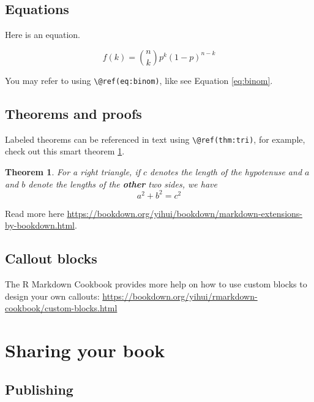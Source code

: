 \documentclass[
]{book}
\newtheorem{theorem}{Theorem}[chapter]
\theoremstyle{definition}
\theoremstyle{definition}
\theoremstyle{definition}
\theoremstyle{definition}
\theoremstyle{remark}
\begin{document}
\hypertarget{equations}{%
\section{Equations}\label{equations}}

Here is an equation.

\begin{equation} 
  f\left(k\right) = \binom{n}{k} p^k\left(1-p\right)^{n-k}
  \label{eq:binom}
\end{equation}

You may refer to using \texttt{\textbackslash{}@ref(eq:binom)}, like see Equation \eqref{eq:binom}.

\hypertarget{theorems-and-proofs}{%
\section{Theorems and proofs}\label{theorems-and-proofs}}

Labeled theorems can be referenced in text using \texttt{\textbackslash{}@ref(thm:tri)}, for example, check out this smart theorem \ref{thm:tri}.

\begin{theorem}
\protect\hypertarget{thm:tri}{}\label{thm:tri}For a right triangle, if \(c\) denotes the \emph{length} of the hypotenuse
and \(a\) and \(b\) denote the lengths of the \textbf{other} two sides, we have
\[a^2 + b^2 = c^2\]
\end{theorem}

Read more here \url{https://bookdown.org/yihui/bookdown/markdown-extensions-by-bookdown.html}.

\hypertarget{callout-blocks}{%
\section{Callout blocks}\label{callout-blocks}}

The R Markdown Cookbook provides more help on how to use custom blocks to design your own callouts: \url{https://bookdown.org/yihui/rmarkdown-cookbook/custom-blocks.html}

\hypertarget{sharing-your-book}{%
\chapter{Sharing your book}\label{sharing-your-book}}

\hypertarget{publishing}{%
\section{Publishing}\label{publishing}}
\end{document}
